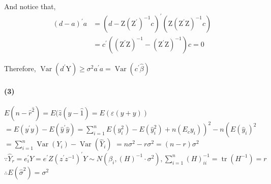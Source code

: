 \documentclass[11pt]{article}
\begin{document}
And notice that,
\begin{align*}
	(d-a)^{\prime} a
	&=\left(d-\mathrm{Z}\left(\mathrm{Z}^{\prime}\right)^{-1} c\right)^{\prime}\left(\mathrm{Z}\left(\mathrm{Z}^{\prime}\mathrm{Z}\right)^{-1} c\right)\\
	&=c^{\prime}\left(\left(\mathrm{Z}^{\prime} \mathrm{Z}\right)^{-1}-(\mathrm{Z}^\prime \mathrm{Z})^{-1}\right) c=0
\end{align*}

Therefore, $\operatorname{Var}\left(d^{\prime} \mathrm{Y}\right) \geqslant \sigma^{2} a^{\prime} a=\operatorname{Var}\left(c^{\prime} \hat{\beta}\right)$
\paragraph{(3)} $E\left(n-\hat{r}^{\hat{2}}\right)=E(\hat{z}(y-\hat{1})=E(\varepsilon(y+y))$
$\left.=E\left(y^{\prime} y\right)-E\left(\hat{y}^{\prime} \hat{y}\right)=\sum_{i=1}^{n} E\left(y_{i}^{2}\right)-E\left(\hat{y}_{i}^{2}\right)+n\left(E_{c} y_{i}\right)\right)^{2}-n\left(E\left(\hat{y}_{i}\right)^{2}\right.$
$=\sum_{i=1}^{n} \operatorname{Var}\left(Y_{i}\right)-\operatorname{Var}\left(\hat{Y}_{i}\right)$
$=n \sigma^{2}-r \sigma^{2}=(n-r) \sigma^{2}$
$\because \hat{Y}_{r}=e_{i}^{\prime} \hat{Y}=e^{\prime} Z\left(z^{\prime} z^{-1}\right)^{\prime} Y \sim N\left(\beta_{i},(H)^{-1} \cdot \sigma^{2}\right), \sum_{i=1}^{n}(H)_{i i}^{-1}=\operatorname{tr}\left(H^{-1}\right)=r$
$\therefore E\left(\hat{\sigma}^{2}\right)=\sigma^{2}$
\end{document}
